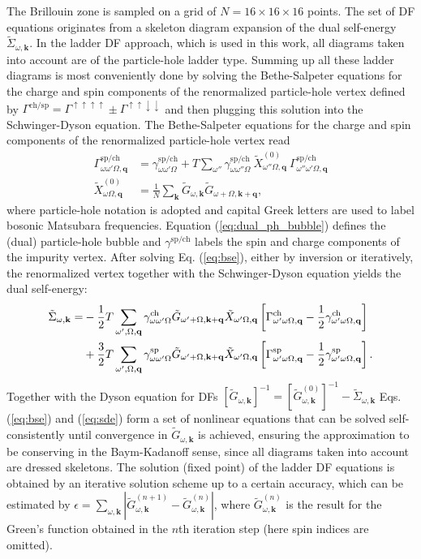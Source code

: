 \documentclass[aps,prb,twocolumn,amsmath,notitlepage,floatfix,footinbib,superscriptaddress,showpacs, showkeys]{revtex4-1}
\newcommand{\kay}{\mathbf{k}}
\newcommand{\cue}{\mathbf{q}}
\newcommand{\up}{\uparrow}
\newcommand{\down}{\downarrow}
\begin{document}
\begin{appendix}
The Brillouin zone is sampled on a grid of $N=16\times16\times16$ points.
The set of DF equations originates from a skeleton diagram expansion of the dual self-energy $\tilde{\Sigma}_{\omega,\kay}$. In the ladder DF approach, which is used in this work, all diagrams taken into account are of the particle-hole ladder type. Summing up all these ladder diagrams is most conveniently done by solving the Bethe-Salpeter equations for the charge and spin components of the renormalized particle-hole vertex defined by $\Gamma^{\text{ch/sp}}=\Gamma^{\up\up\up\up}\pm\Gamma^{\up\up\down\down}$ and then plugging this solution into the Schwinger-Dyson equation. The Bethe-Salpeter equations for the charge and spin components of the renormalized particle-hole vertex read
\begin{align}\label{eq:bse}
\Gamma^{\text{sp/ch}}_{\omega\omega'\Omega,\cue} &= \gamma^{\text{sp/ch}}_{\omega\omega'\Omega}+T\sum_{\omega''}\gamma^{\text{sp/ch}}_{\omega\omega''\Omega} \ \tilde{X}^{(0)}_{\omega''\Omega,\cue} \ \Gamma^{\text{sp/ch}}_{\omega''\omega'\Omega,\cue}\\
\tilde{X}^{(0)}_{\omega\Omega,\cue}&=\frac{1}{N}\sum_\kay \tilde{G}_{\omega,\kay}\tilde{G}_{\omega+\Omega,\kay+\cue} \label{eq:dual_ph_bubble} ,
\end{align}
where particle-hole notation is adopted and capital Greek letters are used to label bosonic Matsubara frequencies. Equation (\ref{eq:dual_ph_bubble}) defines the (dual) particle-hole bubble and $\gamma^{\text{sp/ch}}$ labels the spin and charge components of the impurity vertex. After solving Eq. (\ref{eq:bse}), either by inversion or iteratively, the renormalized vertex together with the Schwinger-Dyson equation yields the dual self-energy:
\begin{align}\label{eq:sde}
\tilde{\Sigma}_{\omega,\kay}=&-\frac{1}{2}T\sum_{\omega',\Omega,\cue}\gamma^{\text{ch}}_{\omega\omega'\Omega}\tilde{G}_{\omega'+\Omega,\kay+\cue}\tilde{X}_{\omega'\Omega,\cue}\left[\Gamma^{\text{ch}}_{\omega'\omega\Omega,\cue}-\frac{1}{2}\gamma^{\text{ch}}_{\omega'\omega\Omega,\cue} \right] \notag \\
&+\frac{3}{2}T\sum_{\omega',\Omega,\cue}\gamma^{\text{sp}}_{\omega\omega'\Omega}\tilde{G}_{\omega'+\Omega,\kay+\cue}\tilde{X}_{\omega'\Omega,\cue}\left[\Gamma^{\text{sp}}_{\omega'\omega\Omega,\cue}-\frac{1}{2}\gamma^{\text{sp}}_{\omega'\omega\Omega,\cue} \right].
\end{align}
Together with the Dyson equation for DFs $\left[\tilde{G}_{\omega,\kay}\right]^{-1}=\left[\tilde{G}^{(0)}_{\omega,\kay}\right]^{-1}-\tilde{\Sigma}_{\omega,\kay}$ Eqs. (\ref{eq:bse}) and (\ref{eq:sde}) form a set of nonlinear equations that can be solved self-consistently until convergence in $\tilde{G}_{\omega, \kay}$ is achieved, ensuring the approximation to be conserving in the Baym-Kadanoff sense, since all diagrams taken into account are dressed skeletons. The solution (fixed point) of the ladder DF equations is obtained by an iterative solution scheme up to a certain accuracy, which can be estimated by $\epsilon=\sum_{\omega,\kay}|\tilde{G}^{(n+1)}_{\omega,\kay}-\tilde{G}^{(n)}_{\omega,\kay}|$, where $\tilde{G}^{(n)}_{\omega,\kay}$ is the result for the Green's function obtained in the $n$th iteration step (here spin indices are omitted). 

\end{appendix}
\end{document}
